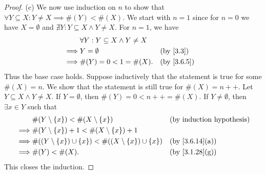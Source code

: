 \begin{proof}{(c)}
  We now use induction on \(n\) to show that \(\forall Y \subseteq X : Y \neq X \implies \#(Y) < \#(X)\).
  We start with \(n = 1\) since for \(n = 0\) we have \(X = \emptyset\) and \(\nexists Y : Y \subseteq X \land Y \neq X\).
  For \(n = 1\), we have
  \begin{align*}
             & \forall Y : Y \subseteq X \land Y \neq X                             \\
    \implies & Y = \emptyset                            &  & \text{(by \cref{3.3})} \\
    \implies & \#(Y) = 0 < 1 = \#(X).                   &  & \by{3.6.5}
  \end{align*}
  Thus the base case holds.
  Suppose inductively that the statement is true for some \(\#(X) = n\).
  We show that the statement is still true for \(\#(X) = n++\).
  Let \(Y \subseteq X \land Y \neq X\).
  If \(Y = \emptyset\), then \(\#(Y) = 0 < n++ = \#(X)\).
  If \(Y \neq \emptyset\), then \(\exists x \in Y\) such that
  \begin{align*}
             & \#(Y \setminus \{x\}) < \#(X \setminus \{x\})                           &  & \byIH                        \\
    \implies & \#(Y \setminus \{x\}) + 1 < \#(X \setminus \{x\}) + 1                                                     \\
    \implies & \#((Y \setminus \{x\}) \cup \{x\}) < \#((X \setminus \{x\}) \cup \{x\}) &  & \text{(by \cref{3.6.14}(a))} \\
    \implies & \#(Y) < \#(X).                                                          &  & \text{(by \cref{3.1.28}(g))}
  \end{align*}
  This closes the induction.
\end{proof}

